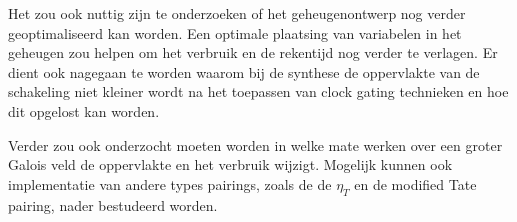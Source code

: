 Het zou ook nuttig zijn te onderzoeken of het geheugenontwerp nog verder geoptimaliseerd kan worden. Een optimale plaatsing van variabelen in het geheugen zou helpen om het verbruik en de rekentijd nog verder te verlagen. Er dient ook nagegaan te worden waarom bij de synthese de oppervlakte van de schakeling niet kleiner wordt na het toepassen van clock gating technieken en hoe dit opgelost kan worden.

Verder zou ook onderzocht moeten worden in welke mate werken over een groter Galois veld de oppervlakte en het verbruik wijzigt. Mogelijk kunnen ook implementatie van andere types pairings, zoals de  de $\eta_T$ en de modified Tate pairing, nader bestudeerd worden.

